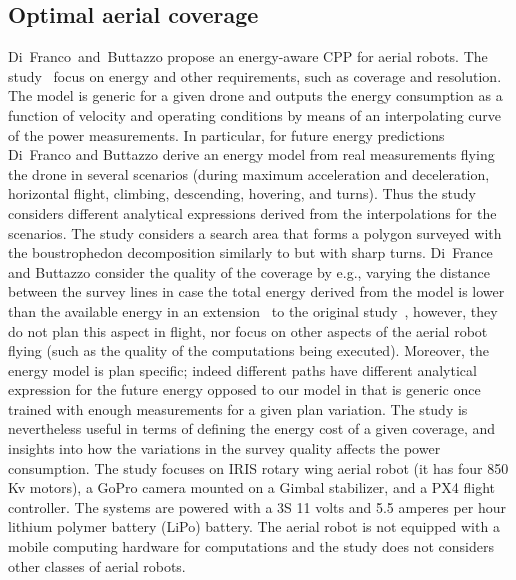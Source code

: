\subsection{Optimal aerial coverage}
\label{sec:opti-cov}

Di~Franco~and~Buttazzo propose an energy-aware CPP for aerial robots. The study~\citep{difranco2015energy} focus on energy and other requirements, such as coverage and resolution.  The model is generic for a given drone and outputs the energy consumption as a function of velocity and operating conditions by means of an interpolating curve of the power measurements. In particular, for future energy predictions Di~Franco and Buttazzo derive an energy model from real measurements flying the drone in several scenarios (during maximum acceleration and deceleration, horizontal flight, climbing, descending, hovering, and turns). Thus the study considers different analytical expressions derived from the interpolations for the scenarios. The study considers a search area that forms a polygon surveyed with the boustrophedon decomposition similarly to  but with sharp turns. Di~France and Buttazzo consider the quality of the coverage by e.g., varying the distance between the survey lines in case the total energy derived from the model is lower than the available energy in an extension~\citep{difranco2016coverage} to the original study~\citep{difranco2015energy}, however, they do not plan this aspect in flight, nor focus on other aspects of the aerial robot flying (such as the quality of the computations being executed). Moreover, the energy model is plan specific; indeed different paths have different analytical expression for the future energy opposed to our model in  that is generic once trained with enough measurements for a given plan variation. The study is nevertheless useful in terms of defining the energy cost of a given coverage, and insights into how the variations in the survey quality affects the power consumption. The study focuses on IRIS rotary wing aerial robot (it has four 850 Kv motors), a GoPro camera mounted on a Gimbal stabilizer, and a PX4 flight controller. The systems are powered with a 3S 11 volts and 5.5 amperes per hour  lithium polymer battery (LiPo) battery. The aerial robot is not equipped with a mobile computing hardware for computations and the study does not considers other classes of aerial robots. 

